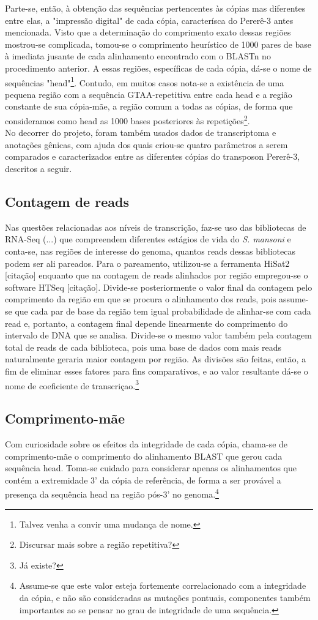 \documentclass[12pt]{article}
\begin{document}
\begin{multicols}{2}
	Parte-se, então, à obtenção das sequências pertencentes às cópias mas diferentes entre elas, a "impressão digital" de cada cópia, caracterísca do Pererê-3 antes mencionada. Visto que a determinação do comprimento exato dessas regiões mostrou-se complicada, tomou-se o comprimento heurístico de 1000 pares de base à imediata jusante de cada alinhamento encontrado com o BLASTn no procedimento anterior. A essas regiões, específicas de cada cópia, dá-se o nome de sequências "head"\footnote{Talvez venha a convir uma mudança de nome.}. Contudo, em muitos casos nota-se a existência de uma pequena região com a sequência GTAA-repetitiva entre cada head e a região constante de sua cópia-mãe, a região comum a todas as cópias, de forma que consideramos como head as 1000 bases posteriores às repetições\footnote{Discursar mais sobre a região repetitiva?}.\\

No decorrer do projeto, foram também usados dados de transcriptoma e anotações gênicas, com ajuda dos quais criou-se quatro parâmetros a serem comparados e caracterizados entre as diferentes cópias do transposon Pererê-3, descritos a seguir.

\subsection{Contagem de reads}
	Nas questões relacionadas aos níveis de transcrição, faz-se uso das bibliotecas de RNA-Seq (...) que compreendem diferentes estágios de vida do \textit{S. mansoni} e conta-se, nas regiões de interesse do genoma, quantos reads dessas bibliotecas podem ser ali pareados. Para o pareamento, utilizou-se a ferramenta HiSat2 [citação] enquanto que na contagem de reads alinhados por região empregou-se o software HTSeq [citação]. Divide-se posteriormente o valor final da contagem pelo comprimento da região em que se procura o alinhamento dos reads, pois assume-se que cada par de base da região tem igual probabilidade de alinhar-se com cada read e, portanto, a contagem final depende linearmente do comprimento do intervalo de DNA que se analisa. Divide-se o mesmo valor também pela contagem total de reads de cada biblioteca, pois uma base de dados com mais reads naturalmente geraria maior contagem por região. As divisões são feitas, então, a fim de eliminar esses fatores para fins comparativos, e ao valor resultante dá-se o nome de coeficiente de transcriçao.\footnote{Já existe?}

\subsection{Comprimento-mãe}
	Com curiosidade sobre os efeitos da integridade de cada cópia, chama-se de comprimento-mãe o comprimento do alinhamento BLAST que gerou cada sequência head. Toma-se cuidado para considerar apenas os alinhamentos que contém a extremidade 3' da cópia de referência, de forma a ser provável a presença da sequência head na região pós-3' no genoma.\footnote{Assume-se que este valor esteja fortemente correlacionado com a integridade da cópia, e não são consideradas as mutações pontuais, componentes também importantes ao se pensar no grau de integridade de uma sequência.}


\end{multicols}
\end{document}
